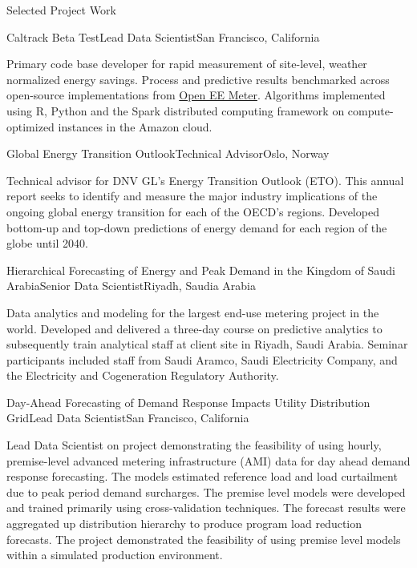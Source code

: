 \documentclass{resume} %
\begin{document}
\begin{rSection}{Selected Project Work}

\begin{rSubsection}{Caltrack Beta Test}{}{Lead Data Scientist}{San Francisco, California}
\item[] Primary code base developer for rapid measurement of site-level, weather normalized energy savings. Process and predictive results benchmarked across open-source implementations from \href{https://github.com/impactlab/caltrack}{Open EE Meter}. Algorithms implemented using R, Python and the Spark distributed computing framework on compute-optimized instances in the Amazon cloud.
\end{rSubsection}

\begin{rSubsection}{Global Energy Transition Outlook}{}{Technical Advisor}{Oslo, Norway}
\item[] Technical advisor for DNV GL's Energy Transition Outlook (ETO). This annual report seeks to identify and measure the major industry implications of the ongoing global energy transition for each of the OECD's regions. Developed bottom-up and top-down predictions of energy demand for each region of the globe until 2040. 
\end{rSubsection}

\begin{rSubsection}{Hierarchical Forecasting of Energy and Peak Demand in the Kingdom of Saudi Arabia}{}{Senior Data Scientist}{Riyadh, Saudia Arabia}
\item[] Data analytics and modeling for the largest end-use metering project in the world. Developed and delivered a three-day course on predictive analytics to subsequently train analytical staff at client site in Riyadh, Saudi Arabia. Seminar participants included staff from Saudi Aramco, Saudi Electricity Company, and the Electricity and Cogeneration Regulatory Authority. 
\end{rSubsection}

\begin{rSubsection}{Day-Ahead Forecasting of Demand Response Impacts Utility Distribution Grid}{}{Lead Data Scientist}{San Francisco, California}
\item[] Lead Data Scientist on project demonstrating the feasibility of using hourly, premise-level advanced metering infrastructure (AMI) data for day ahead demand response forecasting. The models estimated         reference load and load curtailment due to peak period demand surcharges. The premise level models were developed and trained primarily using cross-validation techniques. The forecast results were aggregated up distribution hierarchy to produce program load reduction forecasts. The project demonstrated the feasibility of using premise level models within a simulated production environment.
\end{rSubsection}


\end{rSection}
\end{document}
